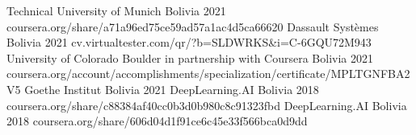 

\begin{cvhonors}
    {Technical University of Munich}
    {Bolivia}
    {2021}
    {coursera.org/share/a71a96ed75ce59ad57a1ac4d5ca66620}
    {Dassault Syst\`emes}
    {Bolivia}
    {2021}
    {cv.virtualtester.com/qr/?b=SLDWRKS\&i=C-6GQU72M943}
    {University of Colorado Boulder in partnership with Coursera}
    {Bolivia}
    {2021}
    {coursera.org/account/accomplishments/specialization/certificate/MPLTGNFBA2V5}
    {Goethe Institut}
    {Bolivia}
    {2021}
    {}
    {DeepLearning.AI}
    {Bolivia}
    {2018}
    {coursera.org/share/c88384af40cc0b3d0b980c8c91323fbd}
    {DeepLearning.AI}
    {Bolivia}
    {2018}
    {coursera.org/share/606d04d1f91ce6c45e33f566bca0d9dd}
\end{cvhonors}
